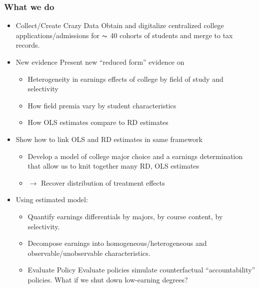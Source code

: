 \documentclass[table,10pt]{beamer}
\begin{document}
\begin{frame}
\frametitle{What we do}

\begin{itemize}
\item<1> \alert{Collect/Create Crazy Data} Obtain and digitalize centralized college applications/admissions for $\thicksim$ 40 cohorts of students and merge to tax records.
  
\item<2> \alert{New evidence} Present new ``reduced form'' evidence on
\begin{itemize}
\item<2> Heterogeneity in earnings effects of college by field of study and selectivity
\item<3> How field premia vary by student characteristics
\item<4> How OLS estimates compare to RD estimates
\end{itemize}

\medskip

\item<5> Show how to link OLS and RD estimates in same framework

\begin{itemize}
\item<6> Develop a model of college major choice and a earnings determination that allow us to knit together many RD, OLS estimates
\item<7> $\rightarrow$ Recover distribution of treatment effects
\end{itemize}

\medskip

\item<8> Using estimated model:

\begin{itemize}
\item<9> \alert{Quantify earnings differentials}  by majors, by course content, by selectivity.\\ \medskip

\item<10> \alert{Decompose earnings} into homogeneous/heterogeneous and observable/unobservable characteristics.\\
\medskip

\item<11> \alert{Evaluate Policy} Evaluate policies simulate counterfactual ``accountability'' policies. What if we shut down low-earning degrees?
\end{itemize}

\end{itemize}

\end{frame}
\end{document}
